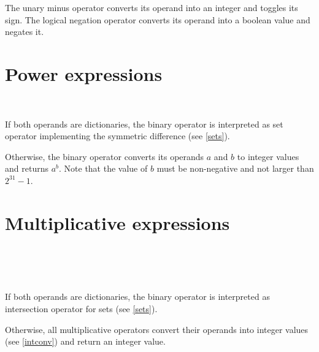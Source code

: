 \noindent
The unary minus operator \token{$-$} converts its operand into an integer
and toggles its sign. The logical negation operator \token{!} converts
its operand into a boolean value and negates it.

\section{Power expressions}

\begin{grammar}
      \produces {} \\
      \produces {}
         \lextoken{\caretSY} 
\end{grammar}

\noindent
If both operands are dictionaries, the binary operator \token{\caretSY}
is interpreted as set operator implementing the symmetric difference
(see \ref{sets}).

Otherwise, the binary operator \token{\caretSY} converts its operands
$a$ and $b$ to integer values and returns $a^b$. Note that
the value of $b$ must be non-negative and not larger than $2^{31}-1$.

\section{Multiplicative expressions}

\begin{grammar}
      \produces {} \\
      \produces {}
         \lextoken{$*$}  \\
      \produces {}
           \\
      \produces {}
          
\end{grammar}

\noindent
If both operands are dictionaries, the binary operator \token{$*$}
is interpreted as intersection
operator for sets (see \ref{sets}).

Otherwise, all multiplicative operators convert their operands into integer
values (see \ref{intconv}) and return an integer value.

